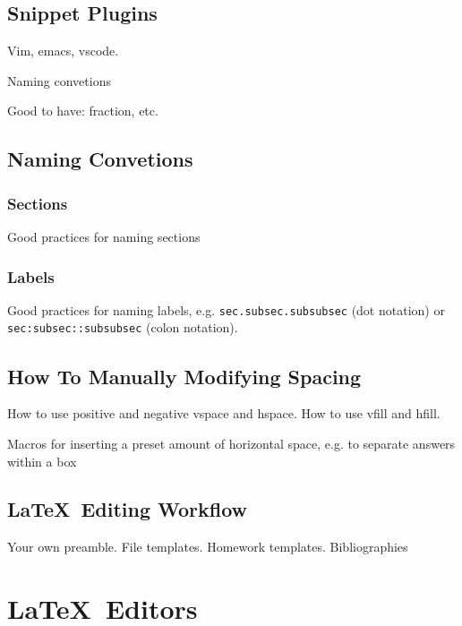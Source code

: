 \documentclass[12pt]{article}
\begin{document}
\subsection{Snippet Plugins}%
\label{bbs.snippet-plugins}

Vim, emacs, vscode.

Naming convetions

Good to have: fraction, etc.

\subsection{Naming Convetions}%
\label{bbs.name-convs}

\subsubsection{Sections}%
\label{bbs.name-convs.sections}

Good practices for naming sections

\subsubsection{Labels}%
\label{bbs.name-convs.labels}

Good practices for naming labels, e.g. \texttt{sec.subsec.subsubsec} (dot notation) or \texttt{sec:subsec::subsubsec} (colon notation).

\subsection{How To Manually Modifying Spacing}%
\label{bbs.spacing}

How to use positive and negative vspace and hspace. How to use vfill and hfill.

Macros for inserting a preset amount of horizontal space, e.g. to separate answers within a box

\subsection{\LaTeX\ Editing Workflow}%
\label{workflow}

Your own preamble. File templates. Homework templates. Bibliographies

\section{\LaTeX\ Editors}%
\label{latex-editors}
\end{document}
